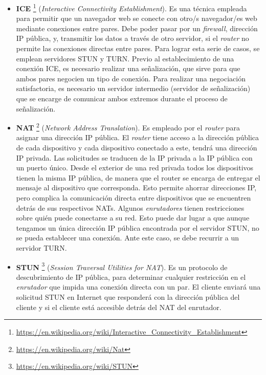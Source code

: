 \documentclass[a4paper, 12pt]{book}
\begin{document}
\begin{itemize}
\item \textbf{ICE} \footnote{\url{https://en.wikipedia.org/wiki/Interactive_Connectivity_Establishment}} (\textit{Interactive Connectivity Establishment}). Es una técnica empleada para permitir que un navegador web se conecte con otro/s navegador/es web mediante conexiones entre pares. Debe poder pasar por un \textit{firewall}, dirección IP pública, y, transmitir los datos a través de otro servidor, si el \textit{router} no permite las conexiones directas entre pares. Para lograr esta serie de casos, se emplean servidores STUN y TURN. Previo al establecimiento de una conexión ICE, es necesario realizar una señalización, que sirve para que ambos pares negocien un tipo de conexión. Para realizar una negociación satisfactoria, es necesario un servidor intermedio (servidor de señalización) que se encarge de comunicar ambos extremos durante el proceso de señalización.

\item \textbf{NAT} \footnote{\url{https://en.wikipedia.org/wiki/Nat}} (\textit{Network Address Translation}). Es empleado por el \textit{router} para asignar una dirección IP pública. El \textit{router} tiene acceso a la dirección pública de cada dispositivo y cada dispositivo conectado a este, tendrá una dirección IP privada. Las solicitudes se traducen de la IP privada a la IP pública con un puerto único. Desde el exterior de una red privada todos los dispositivos tienen la misma IP pública, de manera que el router se encarga de entregar el mensaje al dispositivo que corresponda. Esto permite ahorrar direcciones IP, pero complica la comunicación directa entre dispositivos que se encuentren detrás de sus respectivos NATs. Algunos \textit{enrutadores} tienen restricciones sobre quién puede conectarse a su red. Esto puede dar lugar a que aunque tengamos un única dirección IP pública encontrada por el servidor STUN, no se pueda establecer una conexión. Ante este caso, se debe recurrir a un servidor TURN.

\item \textbf{STUN} \footnote{\url{https://en.wikipedia.org/wiki/STUN}} (\textit{Session Traversal Utilities for NAT}). Es un protocolo de descubrimiento de IP pública, para determinar cualquier restricción en el \textit{enrutador} que impida una conexión directa con un par. El cliente enviará una solicitud STUN en Internet que responderá con la dirección pública del cliente y si el cliente está accesible detrás del NAT del enrutador.


\end{itemize}
\end{document}
